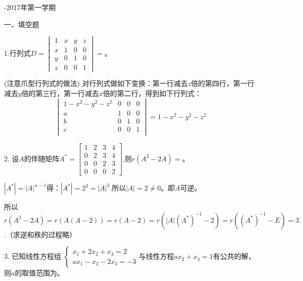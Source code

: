 \documentclass{article}
\begin{document}
\newpage
\hphantom{~~}\hfill {-2017年第一学期} \hfill\hphantom{~~}

一、填空题

1.行列式$
D=
\begin{vmatrix}
  1 & x & y & z\\
  x & 1 & 0 & 0\\
  y & 0 & 1 & 0\\
  z & 0 & 0 & 1
\end{vmatrix}=
$\underline{\hphantom{~~~~~~~~~~}}。

\begin{jie}
(注意爪型行列式的做法)
对行列式做如下变换：第一行减去$z$倍的第四行，第一行减去$y$倍的第三行，第一行减去$x$倍的第二行，得到如下行列式：
\begin{equation*}
  \begin{vmatrix}
  1-x^{2}-y^{2}-z^{2} & 0 & 0 & 0\\
  a & 1 & 0 & 0\\
  b & 0 & 1 & 0\\
  c & 0 & 0 & 1\\
\end{vmatrix}=1-x^{2}-y^{2}-z^{2}
\end{equation*}
\end{jie}

2. 设$A$的伴随矩阵$
A^{*}=
\begin{bmatrix}
  1 & 2 & 3 & 4\\
  0 & 2 & 3 & 4\\
  0 & 0 & 2 & 3\\
  0 & 0 & 0 & 2
\end{bmatrix}
$,则$r(A^{2}-2A)=$\underline{\hphantom{~~~~~~~~~~}}。

\begin{jie}
$|A^*|=|A|^{n-1}$得：$|A^*|=2^3=|A|^{3}$.所以$|A|=2\neq0$。即$A$可逆。

所以$r(A^{2}-2A)=r(A(A-2))=r(A-2)=r(|A|(A^*)^{-1}-2)=r((A^*)^{-1}-E)=3$.（求逆和秩的过程略）
\end{jie}

3. 已知线性方程组
$
\begin{cases}
 x_{1}+2x_{2}+x_{3}=2\\
 ax_{1}-x_{2}-2x_{3}=-3
\end{cases}
$与线性方程$ax_{2}+x_{3}=1$有公共的解，则$a$的取值范围为\underline{\hphantom{~~~~~~~~~~}}。
\end{document}
